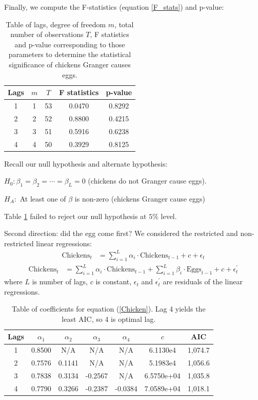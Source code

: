 \documentclass[]{article}
\begin{document}
Finally, we compute the F-statistics (equation \ref{F_stats}) and p-value:
\begin{table}[H]
	\begin{center}
		\begin{tabular}{ | c | c | c |c | c | }
			\hline
			Lags & $m$ &  $T$& F statistics & p-value   \\ \hline 
			1 & 1 & 53 & 0.0470 & 0.8292  \\ \hline 
			2 & 2 & 52 & 0.8800 & 0.4215 \\ \hline 
			3 & 3 & 51 & 0.5916 & 0.6238 \\ \hline 
			4 & 4 & 50 & 0.3929 & 0.8125 \\ \hline 
		\end{tabular}
		\caption{Table of lags, degree of freedom $m$, total number of observations $T$, F statistics and p-value corresponding to those parameters to determine the statistical significance of chickens Granger causes eggs.}
		\label{CE_stats}
	\end{center}
\end{table}
Recall our null hypothesis and alternate hypothesis:

$H_0: \beta_1 = \beta_2 = \cdots = \beta_L = 0$ (chickens do not Granger cause eggs).

$H_A:$ At least one of $\beta$ is non-zero (chickens Granger cause eggs)

Table \ref{CE_stats} failed to reject our null hypothesis at $5 \%$ level.

Second direction: did the egg come first?
We considered the restricted and non-restricted linear regressions:
\begin{align}
	\text{Chickens}_t &= \sum_{i=1}^L \alpha_i \cdot \text{Chickens}_{t-1} + c + \epsilon_t  \label{Chicken}
\end{align}
\begin{align}
	\text{Chickens}_t &= \sum_{i=1}^L \alpha_i \cdot \text{Chickens}_{t-1} + \sum_{i=1}^L \beta_i \cdot \text{Eggs}_{t-1} + c + \epsilon_t^{'} 
	\label{ChickenEgg}
\end{align}
where $L$ is number of lags, $c$ is constant, $\epsilon_t$ and $\epsilon_t^{'}$ are residuals of the linear regressions.


\begin{table}
	\begin{center}
		\begin{tabular}{ | c | c c c c c | c | }
			\hline
			Lags & $\alpha_1$ &  $\alpha_2$& $\alpha_3$ & $\alpha_4$ & $c$ & AIC  \\ \hline 
			1 & 0.8500 & N/A & N/A & N/A & 6.1130e4 & 1,074.7 \\  \hline 
			2 & 0.7576 & 0.1141 & N/A & N/A & 5.1983e4 & 1,056.6 \\  \hline
			3 & 0.7838 & 0.3134 & -0.2567  & N/A & 6.5750e+04 & 1,035.8 \\  \hline
			4 & 0.7790 & 0.3266 & -0.2387 & -0.0384 & 7.0589e+04 & 1,018.1 \\  \hline
		\end{tabular}
		\caption{Table of coefficients for equation (\ref{Chicken}). Lag 4 yields the least AIC, so 4 is optimal lag.}
	\end{center}
\end{table}
\end{document}
